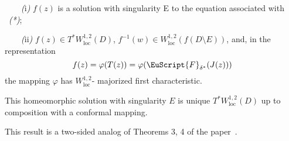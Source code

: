 \begin{summary}
\begin{itshape}
\noindent \ \ \ \ \emph{(}i\emph{)}   $f(z)$
 is a solution with singularity E to the equation associated with ~\emph{(*)};

\noindent \ \ \ \ \emph{(}ii\emph{)}   $f(z)\in T^{*}W^{1,2}_{\mathrm{loc}}(D)$,
$f^{-1}(w)\in W^{1,2}_{\mathrm{loc}}(f(D\setminus E))$, and, in the representation
\begin{equation}
\nonumber
f(z)=\varphi(T(z))=\varphi(\EuScript{F}_{\delta^{*}}(J(z)))
\end{equation}
the mapping $\varphi$ has $W^{1,2}_{\mathrm{loc}}$- majorized first characteristic.

This homeomorphic solution with singularity $E$ is unique $T^{*}W^{1,2}_{\mathrm{loc}}(D)$ up to composition with
a conformal mapping.
\end{itshape}

\bigskip

This result is a two-sided analog of Theorems 3, 4 of the paper~\cite{KondrSibMat}.

\end{summary}



%
